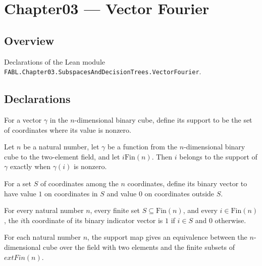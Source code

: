 \chapter{Chapter03 — Vector Fourier}
\section{Overview}

Declarations of the Lean module \texttt{FABL.Chapter03.SubspacesAndDecisionTrees.VectorFourier}.

\section{Declarations}

\begin{definition}
\leanok
For a vector $\gamma$ in the $n$-dimensional binary cube, define its support to be the
set of coordinates where its value is nonzero.
\end{definition}

\begin{theorem}
\leanok
{}
Let $n$ be a natural number, let $\gamma$ be a function from the $n$-dimensional binary
cube to the two-element field, and let $i\text{Fin}(n)$. Then $i$ belongs to the support
of $\gamma$ exactly when $\gamma(i)$ is nonzero.
\end{theorem}

\begin{definition}
\leanok
For a set $S$ of coordinates among the $n$ coordinates, define its binary vector to have
value $1$ on coordinates in $S$ and value $0$ on coordinates outside $S$.
\end{definition}

\begin{theorem}
\leanok
{}
For every natural number $n$, every finite set $S\subseteq\mathrm{Fin}(n)$, and every
$i\in\mathrm{Fin}(n)$, the $i$th coordinate of its binary indicator vector is $1$ if
$i\in S$ and $0$ otherwise.
\end{theorem}

\begin{definition}
\leanok
{}
For each natural number $n$, the support map gives an equivalence between the
$n$-dimensional cube over the field with two elements and the finite subsets of
$	ext{Fin}(n)$.
\end{definition}

